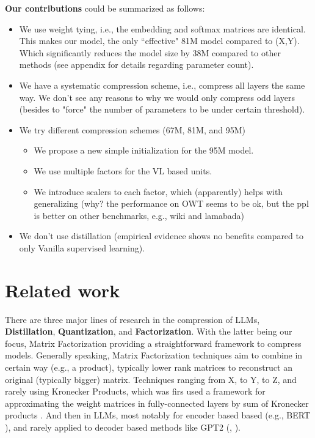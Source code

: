 \documentclass{article}
\begin{document}
\textbf{Our contributions} could be summarized as follows:
\begin{itemize}
    \item We use weight tying, i.e., the embedding and softmax matrices are identical. This makes our model, the only ``effective" 81M model compared to (X,Y). Which significantly reduces the model size by 38M compared to other methods (see appendix for details regarding parameter count).
    \item We have a systematic compression scheme, i.e., compress all layers the same way. We don't see any reasons to why we would only compress odd layers (besides to "force" the number of parameters to be under certain threshold).
    \item We try different compression schemes (67M, 81M, and 95M)
		\begin{itemize}
			\item We propose a new simple initialization for the 95M model.
			\item We use multiple factors for the VL based units.
			\item We introduce scalers to each factor, which (apparently) helps with generalizing (why? the performance on OWT seems to be ok, but the ppl is  better on other benchmarks, e.g., wiki and lamabada)

		\end{itemize}
    \item We don't use distillation (empirical evidence shows no benefits compared to only Vanilla supervised learning).
\end{itemize}

\section{Related work}%
\label{sec:Related work}

There are three major lines of research in the compression of LLMs, \textbf{Distillation}, \textbf{Quantization}, and \textbf{Factorization}. With the latter being our focus, Matrix Factorization providing a straightforward framework to compress models. Generally speaking, Matrix Factorization techniques aim to combine in certain way (e.g., a product), typically lower rank matrices to reconstruct an original (typically bigger) matrix.  Techniques ranging from X, to Y, to Z, and rarely using Kronecker Products, which was firs used a framework for approximating the weight matrices in fully-connected layers by sum of Kronecker products \cite{wu2016compression}. And then in LLMs,  most notably for encoder based based (e.g., BERT \cite{tahaei2022kroneckerbert}), and rarely applied to decoder based methods like GPT2 (\cite{edalati2021kroneckr}, \cite{abronin2024tqcompressor}).
\end{document}
